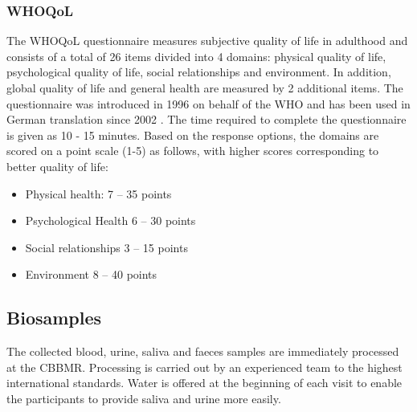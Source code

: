 \QPsychometrics{}

\subsubsection{\acf{WHOQoL}}
\label{questionnaires:WHOQoL}

The \ac{WHOQoL} questionnaire measures subjective quality of life in adulthood and consists of a total of 26 items divided into 4 domains: physical quality of life, psychological quality of life, social relationships and environment. In addition, global quality of life and general health are measured by 2 additional items. The questionnaire was introduced in 1996 \cite{world1996whoqol} on behalf of the \ac{WHO} and has been used in German translation since 2002 \cite{gunzelmann2002whoqol}. The time required to complete the questionnaire is given as 10 - 15 minutes. Based on the response options, the domains are scored on a point scale (1-5) as follows, with higher scores corresponding to better quality of life:

\QScores{}
\begin{itemize}\itemsep2pt
\item Physical health: 7 -- 35 points
\item Psychological Health 6 -- 30 points
\item Social relationships 3 -- 15 points 
\item Environment 8 – 40 points
\end{itemize}

\QPsychometrics{}

\subsection{Biosamples}
\label{subsec:biosamples}
The collected blood, urine, saliva and faeces samples are immediately processed at the \ac{CBBMR}. Processing is carried out by an experienced team to the highest international standards. Water is offered at the beginning of each visit to enable the participants to provide saliva and urine more easily.

